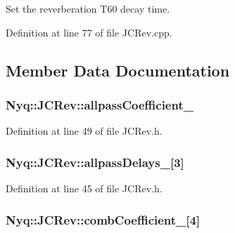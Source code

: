 Set the reverberation T60 decay time. 



Definition at line 77 of file J\+C\+Rev.\+cpp.



\subsection{Member Data Documentation}
\subsubsection[{\texorpdfstring{allpass\+Coefficient\+\_\+}{allpassCoefficient_}}]{ Nyq\+::\+J\+C\+Rev\+::allpass\+Coefficient\+\_\+\hspace{0.3cm}{\ttfamily [protected]}}\hypertarget{class_nyq_1_1_j_c_rev_a7710dad6151fa10066394df81440533e}{}\label{class_nyq_1_1_j_c_rev_a7710dad6151fa10066394df81440533e}


Definition at line 49 of file J\+C\+Rev.\+h.

\subsubsection[{\texorpdfstring{allpass\+Delays\+\_\+}{allpassDelays_}}]{ Nyq\+::\+J\+C\+Rev\+::allpass\+Delays\+\_\+\mbox{[}3\mbox{]}\hspace{0.3cm}{\ttfamily [protected]}}\hypertarget{class_nyq_1_1_j_c_rev_a3084f2988011aeb049273f27cce39fda}{}\label{class_nyq_1_1_j_c_rev_a3084f2988011aeb049273f27cce39fda}


Definition at line 45 of file J\+C\+Rev.\+h.

\subsubsection[{\texorpdfstring{comb\+Coefficient\+\_\+}{combCoefficient_}}]{ Nyq\+::\+J\+C\+Rev\+::comb\+Coefficient\+\_\+\mbox{[}4\mbox{]}\hspace{0.3cm}{\ttfamily [protected]}}\hypertarget{class_nyq_1_1_j_c_rev_ac33893bcdb8e62939ea8807a22fe5502}{}\label{class_nyq_1_1_j_c_rev_ac33893bcdb8e62939ea8807a22fe5502}


